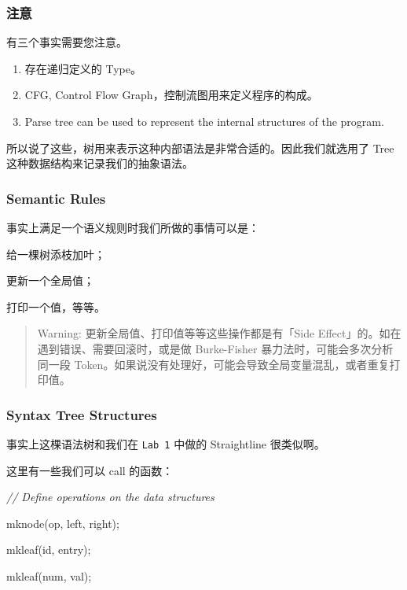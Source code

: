 \documentclass[
]{article}
\newenvironment{Shaded}{}{}
\newcommand{\CommentTok}[1]{\textcolor[rgb]{0.38,0.63,0.69}{\textit{#1}}}
\newcommand{\NormalTok}[1]{#1}
\begin{document}
\hypertarget{header-n99}{%
\subsubsection{注意}\label{header-n99}}

有三个事实需要您注意。

\begin{enumerate}
\def\labelenumi{\arabic{enumi}.}
\item
  存在递归定义的 Type。
\item
  CFG, Control Flow Graph，控制流图用来定义程序的构成。
\item
  Parse tree can be used to represent the internal structures of the
  program.
\end{enumerate}

所以说了这些，树用来表示这种内部语法是非常合适的。因此我们就选用了 Tree
这种数据结构来记录我们的抽象语法。

\hypertarget{header-n109}{%
\subsubsection{Semantic Rules}\label{header-n109}}

事实上满足一个语义规则时我们所做的事情可以是：

给一棵树添枝加叶；

更新一个全局值；

打印一个值，等等。

\begin{quote}
Warning: 更新全局值、打印值等等这些操作都是有「Side
Effect」的。如在遇到错误、需要回滚时，或是做 Burke-Fisher
暴力法时，可能会多次分析同一段
Token。如果说没有处理好，可能会导致全局变量混乱，或者重复打印值。
\end{quote}

\hypertarget{header-n116}{%
\subsubsection{Syntax Tree Structures}\label{header-n116}}

事实上这棵语法树和我们在 \texttt{Lab\ 1} 中做的 Straightline 很类似啊。

这里有一些我们可以 call 的函数：

\begin{Shaded}
\begin{Highlighting}[]
\CommentTok{// Define operations on the data structures}

\NormalTok{mknode(op, left, right);}

\NormalTok{mkleaf(id, entry);}

\NormalTok{mkleaf(num, val);}
\end{Highlighting}
\end{Shaded}
\end{document}

